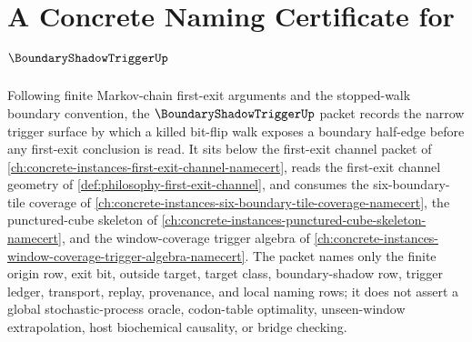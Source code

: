 \chapter{A Concrete Naming Certificate for $\BoundaryShadowTriggerUp$}
\label{ch:concrete-instances-boundary-shadow-trigger-namecert}

Following finite Markov-chain first-exit arguments and the stopped-walk boundary convention, the $\BoundaryShadowTriggerUp$ packet records the narrow trigger surface by which a killed bit-flip walk exposes a boundary half-edge before any first-exit conclusion is read. It sits below the first-exit channel packet of \autoref{ch:concrete-instances-first-exit-channel-namecert}, reads the first-exit channel geometry of \autoref{def:philosophy-first-exit-channel}, and consumes the six-boundary-tile coverage of \autoref{ch:concrete-instances-six-boundary-tile-coverage-namecert}, the punctured-cube skeleton of \autoref{ch:concrete-instances-punctured-cube-skeleton-namecert}, and the window-coverage trigger algebra of \autoref{ch:concrete-instances-window-coverage-trigger-algebra-namecert}. The packet names only the finite origin row, exit bit, outside target, target class, boundary-shadow row, trigger ledger, transport, replay, provenance, and local naming rows; it does not assert a global stochastic-process oracle, codon-table optimality, unseen-window extrapolation, host biochemical causality, or bridge checking.

